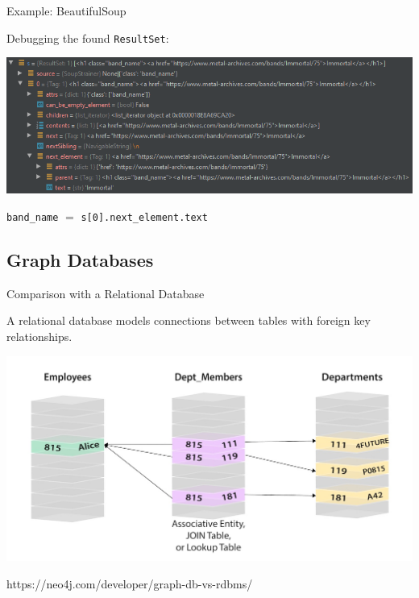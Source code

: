 \documentclass{beamer}
\begin{document}
    \begin{frame}{Example: BeautifulSoup}

      Debugging the found \texttt{ResultSet}:

      \begin{center}
        \includegraphics[scale=1.6]{debug_01}
      \end{center}
      
      \texttt{band\_name} $=$ \texttt{s[0].next\_element.text}
    \end{frame}

  \subsection{Graph Databases}

    \begin{frame}{Comparison with a Relational Database}
    
      A relational database models connections between tables with foreign key relationships.
      
      \begin{center}
        \includegraphics[scale=.2]{relational_as_graph}
      \end{center}
      
      https://neo4j.com/developer/graph-db-vs-rdbms/
      
    \end{frame}
    
\end{document}
